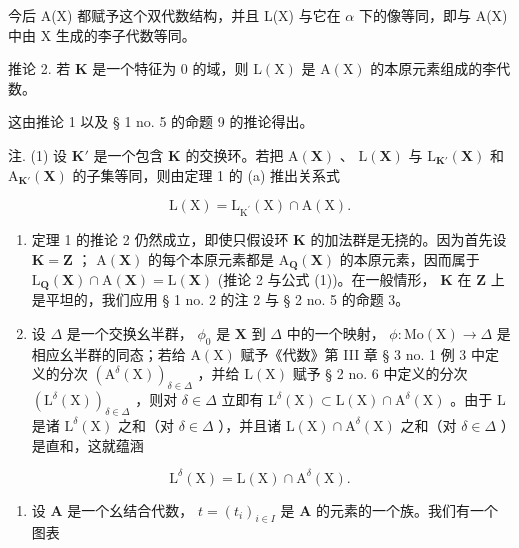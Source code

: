 今后 A(X) 都赋予这个双代数结构，并且 L(X) 与它在 \(\alpha\) 下的像等同，即与 A(X) 中由 X 生成的李子代数等同。

推论 2. 若 \(\mathbf{K}\) 是一个特征为 0 的域，则 \(\mathrm{L}(\mathrm{X})\) 是 \(\mathrm{A}(\mathrm{X})\) 的本原元素组成的李代数。

这由推论 1 以及 § 1 no. 5 的命题 9 的推论得出。

注. (1) 设 \(\mathbf{K}'\) 是一个包含 \(\mathbf{K}\) 的交换环。若把 \(\mathrm{A}(\mathbf{X})\) 、 \(\mathrm{L}(\mathbf{X})\) 与 \(\mathrm{L}_{\mathbf{K}'}(\mathbf{X})\) 和 \(\mathrm{A}_{\mathbf{K}'}(\mathbf{X})\) 的子集等同，则由定理 1 的 (a) 推出关系式

\[
\mathrm{L} (\mathrm{X}) = \mathrm{L} _ {\mathrm{K} ^ {\prime}} (\mathrm{X}) \cap \mathrm{A} (\mathrm{X}).\tag{1}
\]

\begin{enumerate}
\def\labelenumi{(\arabic{enumi})}
\setcounter{enumi}{1}
\item
  定理 1 的推论 2 仍然成立，即使只假设环 \(\mathbf{K}\) 的加法群是无挠的。因为首先设 \(\mathbf{K} = \mathbf{Z}\) ； \(\mathrm{A}(\mathbf{X})\) 的每个本原元素都是 \(\mathrm{A}_{\mathbf{Q}}(\mathbf{X})\) 的本原元素，因而属于 \(\mathrm{L}_{\mathbf{Q}}(\mathbf{X}) \cap \mathrm{A}(\mathbf{X}) = \mathrm{L}(\mathbf{X})\) (推论 2 与公式 (1))。在一般情形， \(\mathbf{K}\) 在 \(\mathbf{Z}\) 上是平坦的，我们应用 § 1 no. 2 的注 2 与 § 2 no. 5 的命题 3。
\item
  设 \(\Delta\) 是一个交换幺半群， \(\phi_0\) 是 \(\mathbf{X}\) 到 \(\Delta\) 中的一个映射， \(\phi \colon \mathrm{Mo}(\mathrm{X})\to \Delta\) 是相应幺半群的同态；若给 \(\mathrm{A}(\mathrm{X})\) 赋予《代数》第 III 章 § 3 no. 1 例 3 中定义的分次 \((\mathrm{A}^{\delta}(\mathrm{X}))_{\delta \in \Delta}\) ，并给 \(\mathrm{L}(\mathrm{X})\) 赋予 § 2 no. 6 中定义的分次 \((\mathrm{L}^{\delta}(\mathrm{X}))_{\delta \in \Delta}\) ，则对 \(\delta \in \Delta\) 立即有 \(\mathrm{L}^{\delta}(\mathrm{X})\subset \mathrm{L}(\mathrm{X})\cap \mathrm{A}^{\delta}(\mathrm{X})\) 。由于 \(\mathrm{L}\) 是诸 \(\mathrm{L}^{\delta}(\mathrm{X})\) 之和（对 \(\delta \in \Delta\) ），并且诸 \(\mathrm{L}(\mathrm{X})\cap \mathrm{A}^{\delta}(\mathrm{X})\) 之和（对 \(\delta \in \Delta\) ）是直和，这就蕴涵
\end{enumerate}

\[
\mathrm{L} ^ {\delta} (\mathrm{X}) = \mathrm{L} (\mathrm{X}) \cap \mathrm{A} ^ {\delta} (\mathrm{X}).\tag{2}
\]

\begin{enumerate}
\def\labelenumi{(\arabic{enumi})}
\setcounter{enumi}{3}
\tightlist
\item
  设 \(\mathbf{A}\) 是一个幺结合代数， \(t = (t_i)_{i \in I}\) 是 \(\mathbf{A}\) 的元素的一个族。我们有一个图表
\end{enumerate}

